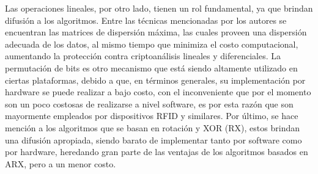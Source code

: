 \documentclass[a4paper,10pt]{article}
\begin{document}
	Las operaciones lineales, por otro lado, tienen un rol fundamental, ya que brindan difusión a los algoritmos. Entre las técnicas mencionadas por los autores se encuentran las matrices de dispersión máxima, las cuales proveen una dispersión adecuada de los datos, al mismo tiempo que minimiza el costo computacional, aumentando la protección contra criptoanálisis lineales y diferenciales. La permutación de bits es otro mecanismo que está siendo altamente utilizado en ciertas plataformas, debido a que, en términos generales, su implementación por hardware se puede realizar a bajo costo, con el inconveniente que por el momento son un poco costosas de realizarse a nivel software, es por esta razón que son mayormente empleados por dispositivos RFID y similares. Por último, se hace mención a los algoritmos que se basan en rotación y XOR (RX), estos brindan una difusión apropiada, siendo barato de implementar tanto por software como por hardware, heredando gran parte de las ventajas de los algoritmos basados en ARX, pero a un menor costo.
	
\end{document}
